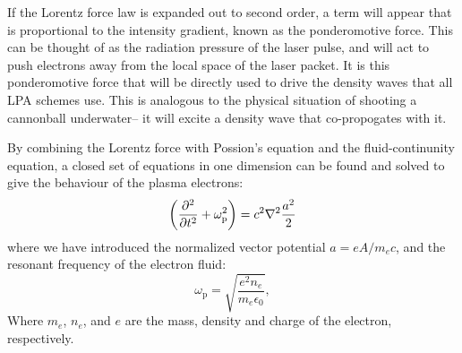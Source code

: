 \documentclass[12pt,letter]{article}
\begin{document}
If the Lorentz force law is expanded out to second order, a term will appear that is
proportional to the intensity gradient, known as the ponderomotive force. This can be
thought of as the radiation pressure of the laser pulse, and will act to push
electrons away from the local space of the laser packet. It is this
ponderomotive force that will be directly used to drive the density waves that
all LPA schemes use. This is analogous to the physical situation of shooting a
cannonball underwater-- it will excite a density wave that co-propogates with
it.

By combining the Lorentz force with Possion's equation and the
fluid-continunity equation, a closed set of equations in one dimension can be found and solved to
give the behaviour of the plasma electrons:
\begin{equation}
    \label{eq:wave}
    \qty( \pdv[2]{t} + \omega_\mathrm{p}^2 ) = c^2 \laplacian \frac{a^2}{2}
\end{equation}
where we have introduced the normalized vector potential $a = eA/m_e c$, and the
resonant frequency of the electron fluid:
\begin{equation}
    \label{eq:wp}
    \omega_\mathrm{p} = \sqrt{\frac{e^2 n_e}{m_e \epsilon_0}},
\end{equation}
Where $m_e$, $n_e$, and $e$ are the mass, density and charge of the electron, respectively.
\end{document}
